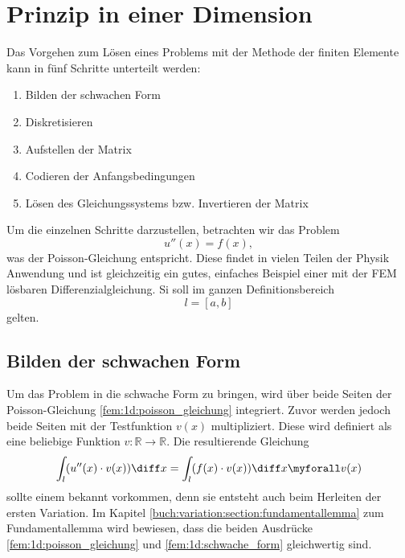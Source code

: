 %
%
%
%
\section{Prinzip in einer Dimension\label{fem:1d}}

Das Vorgehen zum Lösen eines Problems mit der Methode der finiten Elemente kann in fünf Schritte unterteilt werden:
\begin{enumerate}
    \item Bilden der schwachen Form
    \item Diskretisieren
    \item Aufstellen der Matrix
    \item Codieren der Anfangsbedingungen
    \item Lösen des Gleichungssystems bzw. Invertieren der Matrix
\end{enumerate}

Um die einzelnen Schritte darzustellen, betrachten wir das Problem
\begin{equation}
    u''(x) = f(x)
    \label{fem:1d:poisson_gleichung},
\end{equation}
was der Poisson-Gleichung entspricht. 
Diese findet in vielen Teilen der Physik Anwendung und ist gleichzeitig ein gutes, einfaches Beispiel einer mit der FEM lösbaren Differenzialgleichung.
Si soll im ganzen Definitionsbereich
\begin{equation}
    l = [a,b]
\end{equation}
gelten.


\subsection{Bilden der schwachen Form}
Um das Problem in die schwache Form zu bringen, wird über beide Seiten der Poisson-Gleichung \ref{fem:1d:poisson_gleichung} integriert.
Zuvor werden jedoch beide Seiten mit der Testfunktion $ v(x) $ multipliziert.
Diese wird definiert als eine beliebige Funktion $ v \colon \mathbb{R} \rightarrow \mathbb{R} $.
Die resultierende Gleichung
\begin{equation}
    \int_l(u''(x) \cdot v(x)) \diff x = \int_l(f(x) \cdot v(x)) \diff x \myforall v(x)
    \label{fem:1d:schwache_form}
\end{equation}
sollte einem bekannt vorkommen, denn sie entsteht auch beim Herleiten der ersten Variation.
Im Kapitel \ref{buch:variation:section:fundamentallemma} zum Fundamentallemma wird bewiesen, dass die beiden Ausdrücke \ref{fem:1d:poisson_gleichung} und \ref{fem:1d:schwache_form} gleichwertig sind.

